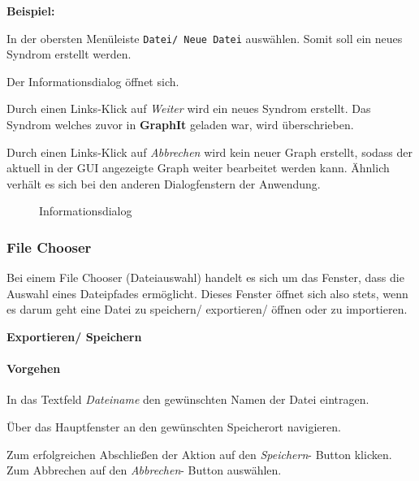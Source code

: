 \documentclass[enabledeprecatedfontcommands,fontsize=11pt,paper=a4,twoside]{scrartcl}
\newcommand*{\action}{\paragraph{Vorgehen}}
\let\origenumerate\enumerate
\let\origendenumerate\endenumerate
\renewenvironment{enumerate}{\origenumerate \addtolength{\itemsep}{-10.0pt}}{\origendenumerate}
\begin{document}
\textbf{Beispiel:}
	\begin{enumerate}
		\item In der obersten Menüleiste \texttt{Datei/ Neue Datei} auswählen. Somit soll ein neues Syndrom erstellt werden.
		\item Der Informationsdialog öffnet sich.
		\item Durch einen Links-Klick auf \textit{Weiter} wird ein neues Syndrom erstellt. Das Syndrom welches zuvor in \textbf{GraphIt} geladen war, wird überschrieben. 
		\item Durch einen Links-Klick auf \textit{Abbrechen} wird kein neuer Graph erstellt, sodass der aktuell in der GUI angezeigte Graph weiter bearbeitet werden kann. 
	\end{enumerate}
Ähnlich verhält es sich bei den anderen Dialogfenstern der Anwendung.\\
	\begin{figure}[ht!]
	\centering
	\caption{Informationsdialog}
\end{figure}

\newpage
	
\subsubsection{File Chooser} 
Bei einem File Chooser (Dateiauswahl) handelt es sich um das Fenster, dass die Auswahl eines Dateipfades ermöglicht. Dieses Fenster öffnet sich also stets, wenn es darum geht eine Datei zu speichern/ exportieren/ öffnen oder zu importieren. 

\textbf{Exportieren/ Speichern}
\action
\begin{enumerate}
	\item In das Textfeld \textit{Dateiname} den gewünschten Namen der Datei eintragen. 
	\item Über das Hauptfenster an den gewünschten Speicherort navigieren. 
	\item Zum erfolgreichen Abschließen der Aktion auf den \textit{Speichern}- Button klicken. Zum Abbrechen auf den \textit{Abbrechen}- Button auswählen.
\end{enumerate}
\end{document}
